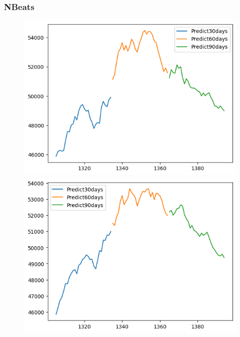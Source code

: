 \subsubsection{NBeats}
\begin{figure}[H]
    \centering
    \begin{minipage}{0.15\textwidth}
    \centering
    \includegraphics[width=1\textwidth]{resources/chapter-5/newdata1/predicted/BIDV_NBeats_7-3_30days.png}
    \end{minipage}
    \hfill
    \begin{minipage}{0.15\textwidth}
    \centering
    \includegraphics[width=1\textwidth]{resources/chapter-5/newdata1/predicted/BIDV_NBeats_8-2_30days.png}
    \end{minipage}

\end{figure}
